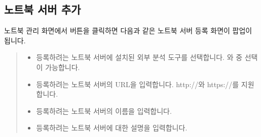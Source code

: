 \documentclass[letterpaper,10pt,english]{sphinxmanual}
\begin{document}
\subsection{노트북 서버 추가}
\label{\detokenize{discovery/part05/notebook_management:id3}}
노트북 관리 화면에서  버튼을 클릭하면 다음과 같은 노트북 서버 등록 화면이 팝업이 됩니다.
\begin{quote}

\begin{figure}[H]
\centering

\noindent{}
\end{figure}
\begin{itemize}
\item {} 
 등록하려는 노트북 서버에 설치된 외부 분석 도구를 선택합니다. 와  중 선택이 가능합니다.

\item {} 
 등록하려는 노트북 서버의 URL을 입력합니다. http://와 https://를 지원합니다.

\item {} 
 등록하려는 노트북 서버의 이름을 입력합니다.

\item {} 
 등록하려는 노트북 서버에 대한 설명을 입력합니다.

\end{itemize}
\end{quote}
\end{document}
